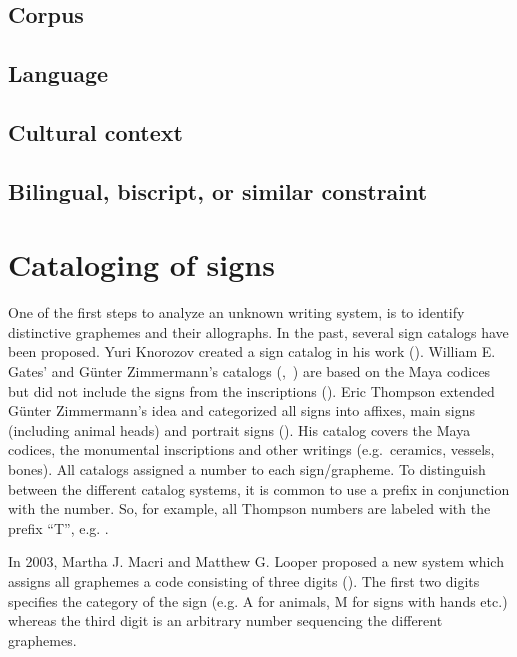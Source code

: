 \documentclass[../main.tex]{subfiles}
\begin{document}
\subsection{Corpus}

\subsection{Language}

\subsection{Cultural context}

\subsection{Bilingual, biscript, or similar constraint}


\section{Cataloging of signs}
One of the first steps to analyze an unknown writing system, is to identify distinctive graphemes 
and their allographs. 
In the past, several sign catalogs have been proposed.
Yuri Knorozov created a sign catalog in his work (\cite[109\psq]{knorozov1967}).
William E. Gates' and G\"unter Zimmermann's catalogs (\cite{gates1931},~\cite{zimmermann1956}) are 
based on the Maya codices but did not include the signs from the inscriptions 
(\cite[4]{thompson1962catalog}). 
Eric Thompson extended G\"unter Zimmermann's idea and categorized all signs into affixes, main signs 
(including animal heads) and portrait signs (\cite[4]{thompson1962catalog}).
His catalog covers the Maya codices, the monumental inscriptions and other writings 
(e.g.\ ceramics, vessels, bones).
All catalogs assigned a number to each sign/grapheme.
To distinguish between the different catalog systems, it is common to use a prefix in 
conjunction with the number.
So, for example, all Thompson numbers are labeled with the prefix ``T'', e.g. .

In 2003, Martha J. Macri and Matthew G. Looper proposed a new system which assigns all graphemes
a code consisting of three digits (\cite[21,25]{macrilooper2003}).
The first two digits specifies the category of the sign 
(e.g. A for animals, M for signs with hands etc.) whereas the third digit is an arbitrary number
sequencing the different graphemes.
\end{document}
